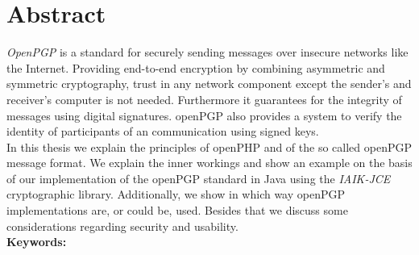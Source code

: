 

\chapter*{Abstract}
\label{cha:abstract}



\emph{OpenPGP} is a standard for securely sending messages over insecure networks like the Internet. Providing end-to-end encryption by combining asymmetric and symmetric cryptography, trust in any network component except the sender's and receiver's computer is not needed. Furthermore it guarantees for the integrity of messages using digital signatures. openPGP also provides a system to verify the identity of participants of an communication using signed keys. \\
 
 
 In this thesis we explain the principles of openPHP and of the so called openPGP message format. 
 We explain the inner workings and show an example on the basis of our implementation 
 of the openPGP standard in Java using the \emph{IAIK-JCE} cryptographic library. 
 Additionally, we show in which way openPGP implementations are, or could be, used.
 Besides that we discuss some considerations regarding security and usability. \\






\textbf{Keywords:} \mykeywords


